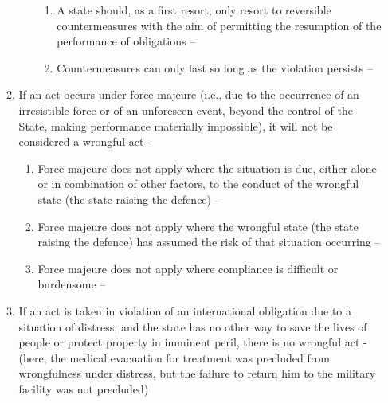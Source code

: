 \begin{enumerate}
\begin{enumerate}
\begin{enumerate}
\begin{enumerate}
                \item A state should, as a first resort, only resort to reversible countermeasures with the aim of permitting the resumption of the performance of obligations -- 
                \item Countermeasures can only last so long as the violation persists -- 
            \end{enumerate}
        \end{enumerate}
        \item If an act occurs under force majeure (i.e., due to the occurrence of an irresistible force or of an unforeseen event, beyond the control of the State, making performance materially impossible), it will not be considered a wrongful act -
        \begin{enumerate}
            \item Force majeure does not apply where the situation is due, either alone or in combination of other factors, to the conduct of the wrongful state (the state raising the defence) -- 
            \item Force majeure does not apply where the wrongful state (the state raising the defence) has assumed the risk of that situation occurring -- 
            \item Force majeure does not apply where compliance is difficult or burdensome -- 
        \end{enumerate}
        \item If an act is taken in violation of an international obligation due to a situation of distress, and the state has no other way to save the lives of people or protect property in imminent peril, there is no wrongful act - (here, the medical evacuation for treatment was precluded from wrongfulness under distress, but the failure to return him to the military facility was not precluded)

\end{enumerate}
\end{enumerate}
